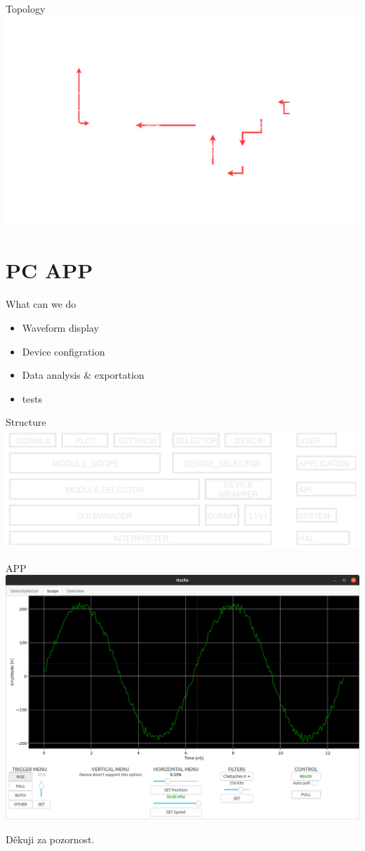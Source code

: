\documentclass{beamer}
\begin{document}
	\begin{frame}{Topology}
		\includegraphics[width=0.98\paperwidth]{Firmware.png}
	\end{frame}


\section{PC APP}
	\begin{frame}{What can we do}
		\begin{itemize}
			\item Waveform display
			\item Device configration
			\item Data analysis \& exportation
			\item tests
		\end{itemize}
	\end{frame}


	\begin{frame}{Structure}
		\includegraphics[width=0.9\paperwidth]{SWlayers.png}
	\end{frame}

	
	\begin{frame}{APP}
		\includegraphics[width=0.965\paperwidth]{Application.png}
	\end{frame}
		




\begin{frame}{}
	\Huge Děkuji za pozornost.
\end{frame}
\end{document}
